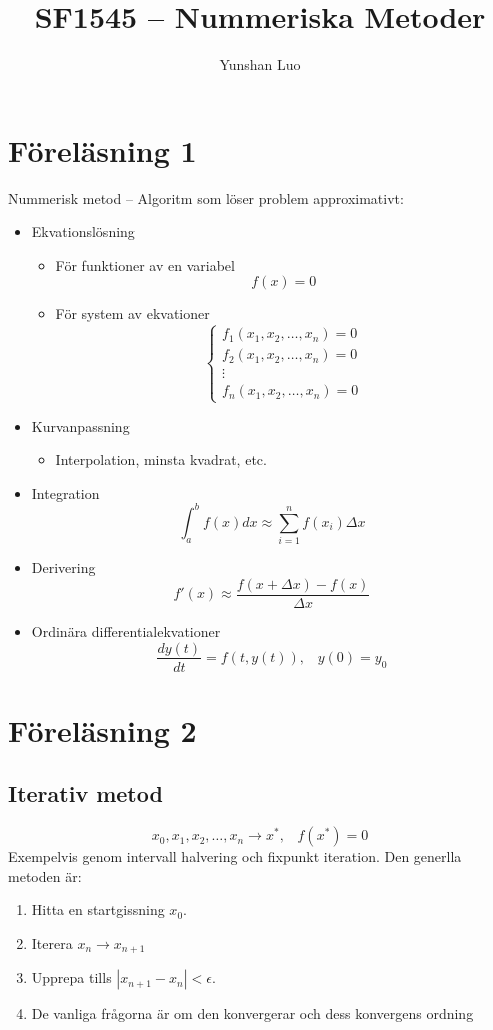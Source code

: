 \documentclass[a4paper,11pt]{article}
\begin{document}
\author{Yunshan Luo}
\title{SF1545 -- Nummeriska Metoder}
\maketitle 
\newpage
\section{Föreläsning 1}
Nummerisk metod -- Algoritm som löser problem approximativt:
\begin{itemize} 
    \item Ekvationslösning
    \begin{itemize}
        \item För funktioner av en variabel
            \[
            f(x) = 0
            \]
        \item För system av ekvationer
            \[
            \begin{cases}
            f_1(x_1, x_2, \ldots, x_n) = 0 \\
            f_2(x_1, x_2, \ldots, x_n) = 0 \\
            \vdots \\
            f_n(x_1, x_2, \ldots, x_n) = 0
            \end{cases}
            \]
    \end{itemize}
    \item Kurvanpassning
    \begin{itemize}
        \item Interpolation, minsta kvadrat, etc.
    \end{itemize}
    \item Integration 
    \[
    \int_a^b f(x) dx \approx \sum_{i=1}^n f(x_i) \Delta x
    \]
    \item Derivering
    \[
    f'(x) \approx \frac{f(x + \Delta x) - f(x)}{\Delta x}
    \]
    \item Ordinära differentialekvationer
    \[
    \frac{dy(t)}{dt} = f(t, y(t)), \hspace{10pt} y(0) = y_0
    \]
\end{itemize}

\section{Föreläsning 2}
\subsection{Iterativ metod}
\[
x_0, x_1, x_2, \ldots, x_n \rightarrow x^*, \hspace{10pt} f(x^*) = 0
\]
Exempelvis genom intervall halvering och fixpunkt iteration. Den generlla metoden är:
\begin{enumerate}
    \item Hitta en startgissning $x_0$.
    \item Iterera $x_{n} \rightarrow x_{n+1}$
    \item Upprepa tills $|x_{n+1} - x_n| < \epsilon$.
    \item De vanliga frågorna är om den konvergerar och dess konvergens ordning
\end{enumerate}
\end{document}
